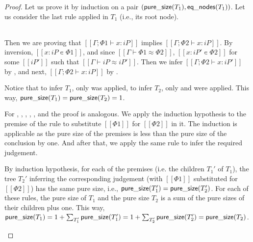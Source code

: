 \begin{proof}
    Let us prove it by induction on a pair $(\mathsf{pure\_size}(T_1), \mathsf{eq\_nodes}(T_1))$.
    Let us consider the last rule applied in $T_1$ (i.e., its root node).
    \begin{caseof}
        \item {}\\
            Then we are proving 
            that $[[Γ ; Φ1 ⊢ x : iP]]$ implies $[[Γ ; Φ2 ⊢ x : iP]]$.
            By inversion, $[[x : iP ∊ Φ1]]$, and 
            since $[[Γ ⊢ Φ1 ≈ Φ2]]$, $[[x : iP' ∊ Φ2]]$ for some $[[iP']]$ 
            such that $[[Γ ⊢ iP ≈ iP']]$.
            Then we infer $[[Γ ; Φ2 ⊢ x : iP']]$ by ,
            and next, $[[Γ ; Φ2 ⊢ x : iP]]$ by .

            Notice that 
            to infer $T_1$, only  was applied, 
            to infer $T_2$, only  and
             were applied.
            This way, $\mathsf{pure\_size}(T_1) = \mathsf{pure\_size}(T_2) = 1$.

        \item For ,
              , 
              ,
              ,
              , and
              the proof is analogous. We
              apply the induction hypothesis to the premise of the rule
              to substitute $[[Φ1]]$ for $[[Φ2]]$ in it. 
              The induction is applicable as the pure size of the 
              premises is less than the pure size of the conclusion by one.
              And after that, we apply the same rule to infer the required judgement.

              By induction hypothesis, 
              for each of the premises (i.e. the children $T_1'$ of $T_1$),
              the tree $T_2'$ inferring the corresponding judgement
              (with $[[Φ1]]$ substituted for $[[Φ2]]$) has the same pure size,
              i.e., $\mathsf{pure\_size}(T_1') = \mathsf{pure\_size}(T_2')$.
              For each of these rules, the pure size of $T_1$ 
              and the pure size $T_2$ is a sum of the pure sizes of their children
              plus one. This way, 
              $ 
                \mathsf{pure\_size}(T_1) =
                1 + \sum_{T'_1}{\mathsf{pure\_size}(T'_1)} =
                1 + \sum_{T'_2}{\mathsf{pure\_size}(T'_2)} =
                \mathsf{pure\_size}(T_2) 
              $.
              

\end{caseof}
\end{proof}
